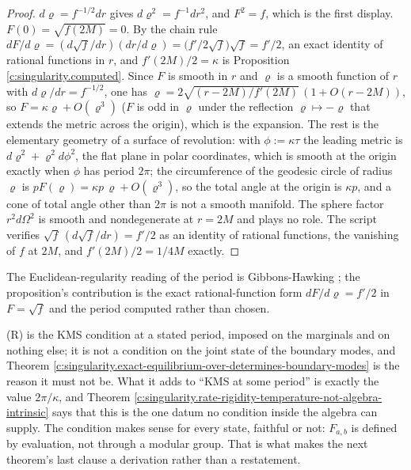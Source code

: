\documentclass[11pt]{article}
\theoremstyle{definition}
\theoremstyle{plain}
\begin{document}
\begin{proof}
$d\varrho = f^{-1/2}dr$ gives $d\varrho^{2} = f^{-1}dr^{2}$, and $F^{2} = f$, which is the first display. $F(0) = \sqrt{f(2M)} = 0$. By the chain rule $dF/d\varrho = (d\sqrt f/dr)(dr/d\varrho) = \bigl(f'/2\sqrt f\bigr)\sqrt f = f'/2$, an exact identity of rational functions in $r$, and $f'(2M)/2 = \kappa$ is Proposition \ref{c:singularity.computed}. Since $F$ is smooth in $r$ and $\varrho$ is a smooth function of $r$ with $d\varrho/dr = f^{-1/2}$, one has $\varrho = 2\sqrt{(r - 2M)/f'(2M)}\,(1 + O(r - 2M))$, so $F = \kappa\varrho + O(\varrho^{3})$ ($F$ is odd in $\varrho$ under the reflection $\varrho \mapsto -\varrho$ that extends the metric across the origin), which is the expansion. The rest is the elementary geometry of a surface of revolution: with $\phi := \kappa\tau$ the leading metric is $d\varrho^{2} + \varrho^{2}d\phi^{2}$, the flat plane in polar coordinates, which is smooth at the origin exactly when $\phi$ has period $2\pi$; the circumference of the geodesic circle of radius $\varrho$ is $pF(\varrho) = \kappa p\,\varrho + O(\varrho^{3})$, so the total angle at the origin is $\kappa p$, and a cone of total angle other than $2\pi$ is not a smooth manifold. The sphere factor $r^{2}d\Omega^{2}$ is smooth and nondegenerate at $r = 2M$ and plays no role. The script verifies $\sqrt f\,(d\sqrt f/dr) = f'/2$ as an identity of rational functions, the vanishing of $f$ at $2M$, and $f'(2M)/2 = 1/4M$ exactly.

\end{proof}

\label{c:note.singularity.setting-fixing-rate-where-premise-has-2}
The Euclidean-regularity reading of the period is Gibbons-Hawking \cite{GibbonsHawking1977, HartleHawking1976}; the proposition's contribution is the exact rational-function form $dF/d\varrho = f'/2$ in $F = \sqrt f$ and the period computed rather than chosen.

\label{c:note.singularity.setting-fixing-rate-where-premise-has-3}
(R) is the KMS condition at a stated period, imposed on the marginals and on nothing else; it is not a condition on the joint state of the boundary modes, and Theorem \ref{c:singularity.exact-equilibrium-over-determines-boundary-modes} is the reason it must not be. What it adds to ``KMS at some period'' is exactly the value $2\pi/\kappa$, and Theorem \ref{c:singularity.rate-rigidity-temperature-not-algebra-intrinsic} says that this is the one datum no condition inside the algebra can supply. The condition makes sense for every state, faithful or not: $F_{a,b}$ is defined by evaluation, not through a modular group. That is what makes the next theorem's last clause a derivation rather than a restatement.
\end{document}
